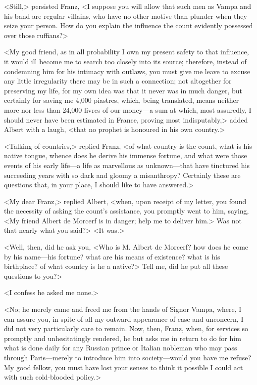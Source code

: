  <Still,> persisted Franz, <I suppose you will allow that such men as Vampa and his band are regular villains, who have no other motive than plunder when they seize your person. How do you explain the influence the count evidently possessed over those ruffians?> 

 <My good friend, as in all probability I own my present safety to that influence, it would ill become me to search too closely into its source; therefore, instead of condemning him for his intimacy with outlaws, you must give me leave to excuse any little irregularity there may be in such a connection; not altogether for preserving my life, for my own idea was that it never was in much danger, but certainly for saving me 4,000 piastres, which, being translated, means neither more nor less than 24,000 livres of our money—a sum at which, most assuredly, I should never have been estimated in France, proving most indisputably,> added Albert with a laugh, <that no prophet is honoured in his own country.> 

 <Talking of countries,> replied Franz, <of what country is the count, what is his native tongue, whence does he derive his immense fortune, and what were those events of his early life—a life as marvellous as unknown—that have tinctured his succeeding years with so dark and gloomy a misanthropy? Certainly these are questions that, in your place, I should like to have answered.> 

 <My dear Franz,> replied Albert, <when, upon receipt of my letter, you found the necessity of asking the count's assistance, you promptly went to him, saying, <My friend Albert de Morcerf is in danger; help me to deliver him.> Was not that nearly what you said?>  <It was.> 

 <Well, then, did he ask you, <Who is M. Albert de Morcerf? how does he come by his name—his fortune? what are his means of existence? what is his birthplace? of what country is he a native?> Tell me, did he put all these questions to you?> 

 <I confess he asked me none.> 

 <No; he merely came and freed me from the hands of Signor Vampa, where, I can assure you, in spite of all my outward appearance of ease and unconcern, I did not very particularly care to remain. Now, then, Franz, when, for services so promptly and unhesitatingly rendered, he but asks me in return to do for him what is done daily for any Russian prince or Italian nobleman who may pass through Paris—merely to introduce him into society—would you have me refuse? My good fellow, you must have lost your senses to think it possible I could act with such cold-blooded policy.> 

